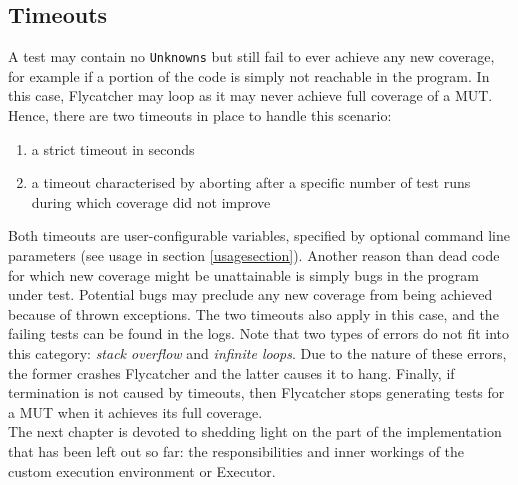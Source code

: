 \subsection{Timeouts}
A test may contain no \texttt{Unknowns} but still fail to ever achieve any new coverage, for example if a portion of the code is simply not reachable in the program. In this case, \textsf{Flycatcher} may loop as it may never achieve full coverage of a MUT. Hence, there are two timeouts in place to handle this scenario:

\begin{enumerate}
   \item a strict timeout in seconds
   \item a timeout characterised by aborting after a specific number of test runs during which coverage did not improve
\end{enumerate}

Both timeouts are user-configurable variables, specified by optional command line parameters (see usage in section \ref{usagesection}). Another reason than dead code for which new coverage might be unattainable is simply bugs in the program under test. Potential bugs may preclude any new coverage from being achieved because of thrown exceptions. The two timeouts also apply in this case, and the failing tests can be found in the logs. Note that two types of errors do not fit into this category: \emph{stack overflow} and \emph{infinite loops}. Due to the nature of these errors, the former crashes \textsf{Flycatcher} and the latter causes it to hang. Finally, if termination is not caused by timeouts, then \textsf{Flycatcher} stops generating tests for a MUT when it achieves its full coverage.\\

The next chapter is devoted to shedding light on the part of the implementation that has been left out so far: the responsibilities and inner workings of the custom execution environment or \textsf{Executor}.